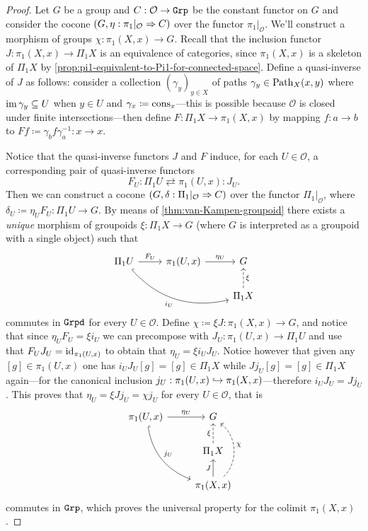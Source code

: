 \begin{proof}
Let \(G\) be a group and \(C: \mathcal{O} \to {\texttt{Grp}}\) be the constant functor on
\(G\) and consider the cocone \((G, \eta: \pi_1|_{\mathcal{O}} \Rightarrow C)\) over
the functor \(\pi_1|_{\mathcal{O}}\). We'll construct a morphism of groups
\(\chi: \pi_1(X, x) \to G\). Recall that the inclusion functor
\(J: \pi_1(X, x) \to \Pi_1 X\) is an equivalence of categories, since
\(\pi_1(X, x)\) is a skeleton of \(\Pi_1 X\) by
\cref{prop:pi1-equivalent-to-Pi1-for-connected-space}. Define a quasi-inverse of
\(J\) as follows: consider a collection \((\gamma_y)_{y \in X}\) of paths
\(\gamma_y \in \operatorname{Path}_X(x, y)\) where \(\operatorname{im} \gamma_y \subseteq U\) when
\(y \in U\) and \(\gamma_x \coloneq \operatorname{cons}_x\)---this is possible because
\(\mathcal{O}\) is closed under finite intersections---then define
\(F: \Pi_1 X \to \pi_1(X, x)\) by mapping \(f: a \to b\) to
\(F f \coloneq \gamma_b f \gamma_a^{-1}: x \to x\).

Notice that the quasi-inverse functors \(J\) and \(F\) induce, for each \(U \in
\mathcal{O}\), a corresponding pair of quasi-inverse functors
\[
F_U \colon \Pi_1 U \rightleftarrows \pi_1(U, x) \colon J_U.
\]
Then we can construct a cocone \((G, \delta: \Pi_1|_{\mathcal{O}} \Rightarrow C)\) over
the functor \(\Pi_1|_{\mathcal{O}}\), where
\(\delta_U \coloneq \eta_U F_U: \Pi_1 U \to G\). By means of
\cref{thm:van-Kampen-groupoid} there exists a \emph{unique} morphism of
groupoids \(\xi: \Pi_1 X \to G\) (where \(G\) is interpreted as a groupoid with a
single object) such that
\[
\begin{tikzcd}
\Pi_1 U \ar[r, "F_U"] \ar[rrd, bend right, hook, "i_U"']
&\pi_1(U, x) \ar[r, "\eta_U"] &G \\
&&\Pi_1 X \ar[u, dashed, "\xi"']
\end{tikzcd}
\]
commutes in \({\texttt{Grpd}}\) for every \(U \in \mathcal{O}\). Define
\(\chi \coloneq \xi J: \pi_1(X, x) \to G\), and notice that since
\(\eta_U F_U = \xi i_U\) we can precompose with \(J_U: \pi_1(U, x) \to \Pi_1 U\)
and use that \(F_U J_U = \operatorname{id}_{\pi_1(U, x)}\) to obtain that
\(\eta_U = \xi i_U J_U\). Notice however that given any \([g] \in \pi_1(U, x)\)
one has \(i_U J_U [g] = [g] \in \Pi_1 X\) while \(J j_U [g] = [g] \in \Pi_1 X\)
again---for the canonical inclusion
\(j_U: \pi_1(U, x) \hookrightarrow \pi_1(X, x)\)---therefore \(i_U J_U = J j_U\). This
proves that \(\eta_U = \xi J j_U = \chi j_U\) for every \(U \in \mathcal{O}\),
that is
\[
\begin{tikzcd}
\pi_1(U, x) \ar[r, "\eta_U"] \ar[rdd, bend right, "j_U", hook] &G \\
&\Pi_1 X \ar[u, dashed, "\xi"] \\
&\pi_1(X, x) \ar[u, "J"] \ar[uu, dashed, bend right=50, "\chi"']
\end{tikzcd}
\]
commutes in \({\texttt{Grp}}\), which proves the universal property for the colimit
\(\pi_1(X, x)\).
\end{proof}

